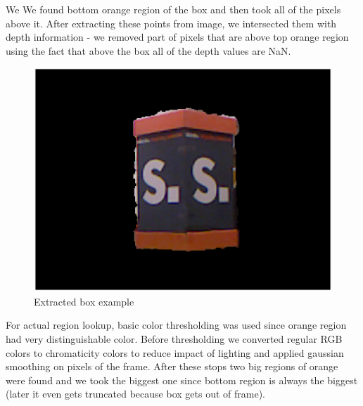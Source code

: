 \documentclass{article}
\begin{document}
We 
We found bottom orange region of the box and then took all of the
pixels above it. After extracting these points from image, we 
intersected them with depth information - we removed part of
pixels that are above top orange region using the fact that above
the box all of the depth values are NaN.

\begin{figure}[h!]
  \centering
  \includegraphics[width=1.0\textwidth]{figs/extracted_box_example}
  \caption{Extracted box example}
  \label{fig:extracted_box_example}
\end{figure}


For actual region lookup, basic color thresholding was used
since orange region had very distinguishable color. Before 
thresholding we converted regular RGB colors
to chromaticity colors to reduce impact of lighting
and applied gaussian smoothing on pixels of
the frame. After these stops two big regions of
orange were found and we took the biggest one
since bottom region is always the biggest (later it 
even gets truncated because box gets out of frame).
\end{document}
